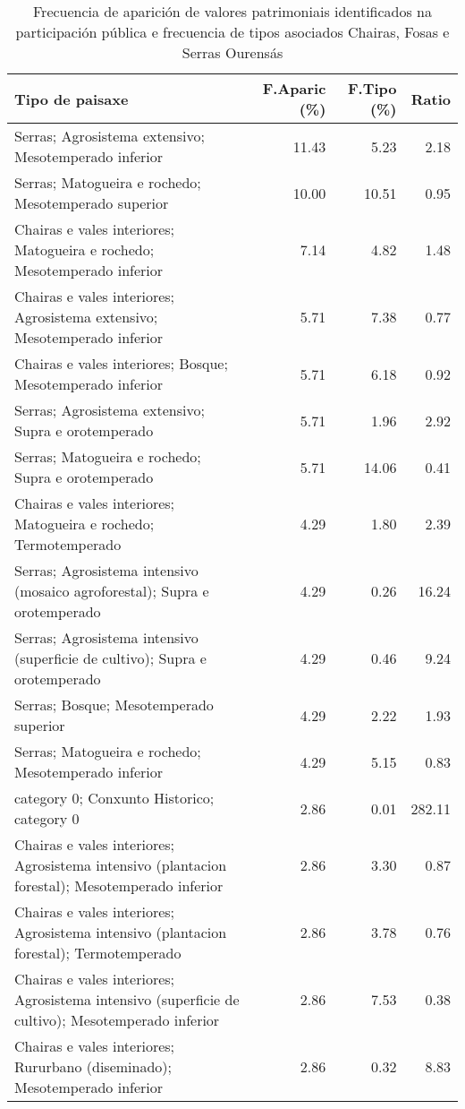 \begin{table}[p]
\centering
\caption{Frecuencia de aparición de valores patrimoniais identificados na participación pública e frecuencia de tipos asociados Chairas, Fosas e Serras Ourensás} 
\label{vsixotpat8}
\begin{tabular}{lrrr}
  \hline
Tipo de paisaxe & F.Aparic (\%) & F.Tipo (\%) & Ratio \\ 
  \hline
Serras; Agrosistema extensivo; Mesotemperado inferior & 11.43 & 5.23 & 2.18 \\ 
  Serras; Matogueira e rochedo; Mesotemperado superior & 10.00 & 10.51 & 0.95 \\ 
  Chairas e vales interiores; Matogueira e rochedo; Mesotemperado inferior & 7.14 & 4.82 & 1.48 \\ 
  Chairas e vales interiores; Agrosistema extensivo; Mesotemperado inferior & 5.71 & 7.38 & 0.77 \\ 
  Chairas e vales interiores; Bosque; Mesotemperado inferior & 5.71 & 6.18 & 0.92 \\ 
  Serras; Agrosistema extensivo; Supra e orotemperado & 5.71 & 1.96 & 2.92 \\ 
  Serras; Matogueira e rochedo; Supra e orotemperado & 5.71 & 14.06 & 0.41 \\ 
  Chairas e vales interiores; Matogueira e rochedo; Termotemperado & 4.29 & 1.80 & 2.39 \\ 
  Serras; Agrosistema intensivo (mosaico agroforestal); Supra e orotemperado & 4.29 & 0.26 & 16.24 \\ 
  Serras; Agrosistema intensivo (superficie de cultivo); Supra e orotemperado & 4.29 & 0.46 & 9.24 \\ 
  Serras; Bosque; Mesotemperado superior & 4.29 & 2.22 & 1.93 \\ 
  Serras; Matogueira e rochedo; Mesotemperado inferior & 4.29 & 5.15 & 0.83 \\ 
  category 0; Conxunto Historico; category 0 & 2.86 & 0.01 & 282.11 \\ 
  Chairas e vales interiores; Agrosistema intensivo (plantacion forestal); Mesotemperado inferior & 2.86 & 3.30 & 0.87 \\ 
  Chairas e vales interiores; Agrosistema intensivo (plantacion forestal); Termotemperado & 2.86 & 3.78 & 0.76 \\ 
  Chairas e vales interiores; Agrosistema intensivo (superficie de cultivo); Mesotemperado inferior & 2.86 & 7.53 & 0.38 \\ 
  Chairas e vales interiores; Rururbano (diseminado); Mesotemperado inferior & 2.86 & 0.32 & 8.83 \\ 

\end{tabular}
\end{table}
